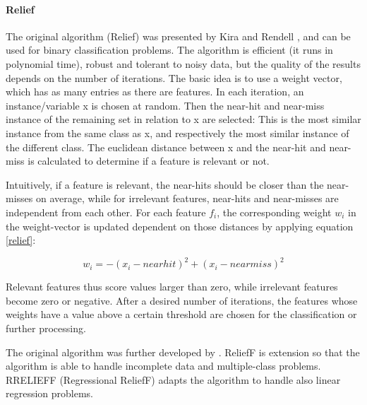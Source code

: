 \paragraph{Relief}
\label{par:methods.flat.filter.relief}

The original algorithm (Relief) was presented by Kira and Rendell \cite{Kira:1992}, and can be used for binary classification problems. The algorithm is efficient (it runs in polynomial time), robust and tolerant to noisy data, but the quality of the results depends on the number of iterations.
The basic idea is to use a weight vector, which has as many entries as there are features. In each iteration, an instance/variable x is chosen at random. Then the near-hit and near-miss instance of the remaining set in relation to x are selected: This is the most similar instance from the same class as x, and respectively the most similar instance of the different class. The euclidean distance between x and the near-hit and near-miss is calculated to determine if a feature is relevant or not.  

Intuitively, if a feature is relevant, the near-hits should be closer than the near-misses on average, while for irrelevant features, near-hits and near-misses are independent from each other. 
For each feature $f_i$, the corresponding weight $w_i$ in the weight-vector is updated dependent on those distances by applying equation \ref{relief}:

\begin{equation}
\label{relief}
w_i = - (x_i - nearhit)^2  + (x_i - nearmiss)^2
\end{equation}

Relevant features thus score values larger than zero, while irrelevant features become zero or negative. After a desired number of iterations, the features whose weights have a value above a certain threshold are chosen for the classification or further processing.

The original algorithm was further developed by \cite{Kononenko:97}. ReliefF  is extension so that the algorithm is able to handle incomplete data and multiple-class problems. 
RRELIEFF (Regressional ReliefF) \cite{Robnik-Sikonja:97} adapts the algorithm to handle also linear regression problems.

